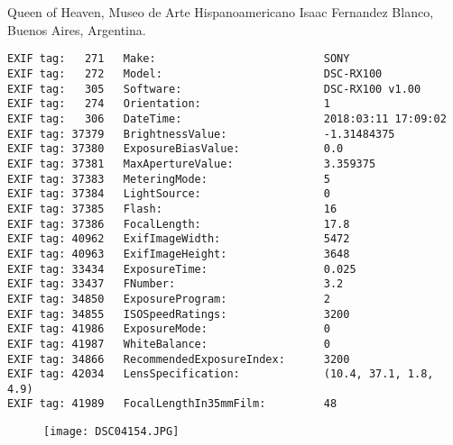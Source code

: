 \section{\protect{}}
\noindent Queen of Heaven, Museo de Arte Hispanoamericano Isaac Fernandez Blanco, Buenos Aires, Argentina.
\noindent
\begin{lstlisting}
EXIF tag:   271   Make:                          SONY
EXIF tag:   272   Model:                         DSC-RX100
EXIF tag:   305   Software:                      DSC-RX100 v1.00
EXIF tag:   274   Orientation:                   1
EXIF tag:   306   DateTime:                      2018:03:11 17:09:02
EXIF tag: 37379   BrightnessValue:               -1.31484375
EXIF tag: 37380   ExposureBiasValue:             0.0
EXIF tag: 37381   MaxApertureValue:              3.359375
EXIF tag: 37383   MeteringMode:                  5
EXIF tag: 37384   LightSource:                   0
EXIF tag: 37385   Flash:                         16
EXIF tag: 37386   FocalLength:                   17.8
EXIF tag: 40962   ExifImageWidth:                5472
EXIF tag: 40963   ExifImageHeight:               3648
EXIF tag: 33434   ExposureTime:                  0.025
EXIF tag: 33437   FNumber:                       3.2
EXIF tag: 34850   ExposureProgram:               2
EXIF tag: 34855   ISOSpeedRatings:               3200
EXIF tag: 41986   ExposureMode:                  0
EXIF tag: 41987   WhiteBalance:                  0
EXIF tag: 34866   RecommendedExposureIndex:      3200
EXIF tag: 42034   LensSpecification:             (10.4, 37.1, 1.8, 4.9)
EXIF tag: 41989   FocalLengthIn35mmFilm:         48

\end{lstlisting}
\clearpage
\begin{figure}
\raggedleft
\texttt{[image: DSC04154.JPG]}
\end{figure}


\clearpage
